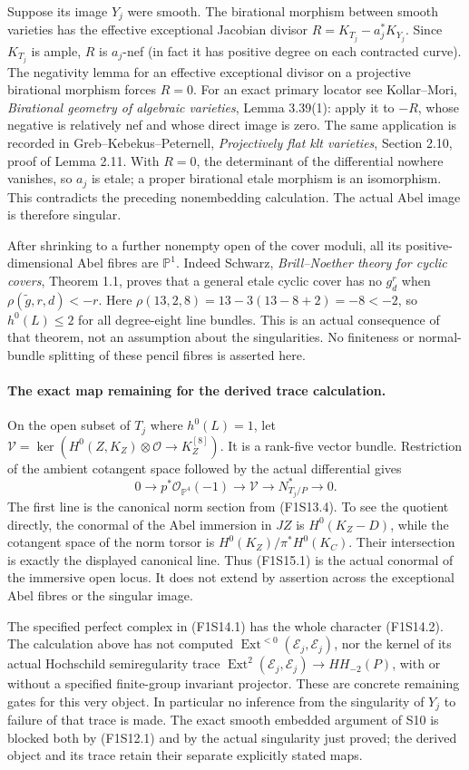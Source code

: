 Suppose its image $Y_j$ were smooth. The birational morphism between
smooth varieties has the effective exceptional Jacobian divisor
$R=K_{T_j}-a_j^*K_{Y_j}$. Since $K_{T_j}$ is ample, $R$ is $a_j$-nef
(in fact it has positive degree on each contracted curve).
The negativity lemma for an effective exceptional divisor on a
projective birational morphism forces $R=0$.
For an exact primary locator see Kollar--Mori, \emph{Birational geometry
of algebraic varieties}, Lemma 3.39(1): apply it to $-R$, whose negative
is relatively nef and whose direct image is zero. The same application
is recorded in Greb--Kebekus--Peternell, \emph{Projectively flat klt
varieties}, Section 2.10, proof of Lemma 2.11.
With $R=0$, the determinant of the differential nowhere vanishes, so
$a_j$ is etale; a proper birational etale morphism is an isomorphism.
This contradicts the preceding nonembedding calculation. The actual
Abel image is therefore singular.

After shrinking to a further nonempty open of the cover moduli, all its
positive-dimensional Abel fibres are $\mathbb P^1$. Indeed Schwarz,
\emph{Brill--Noether theory for cyclic covers}, Theorem 1.1, proves that
a general etale cyclic cover has no $g_d^r$ when
$\rho(\widetilde g,r,d)<-r$. Here
$\rho(13,2,8)=13-3(13-8+2)=-8<-2$, so $h^0(L)\leq2$ for all degree-eight
line bundles. This is an actual consequence of that theorem, not an
assumption about the singularities. No finiteness or normal-bundle
splitting of these pencil fibres is asserted here.

\paragraph{The exact map remaining for the derived trace calculation.}
On the open subset of $T_j$ where $h^0(L)=1$, let
$\mathcal V=\ker(H^0(Z,K_Z)\otimes\mathcal O\to K_Z^{[8]})$.
It is a rank-five vector bundle. Restriction of the ambient cotangent
space followed by the actual differential gives
\[
 0\longrightarrow p^*\mathcal O_{\mathbb P^4}(-1)
 \longrightarrow\mathcal V\longrightarrow N^*_{T_j/P}\longrightarrow0.
 \tag{F1S15.1}
\]
The first line is the canonical norm section from (F1S13.4).
To see the quotient directly, the conormal of the Abel immersion in
$JZ$ is $H^0(K_Z-D)$, while the cotangent space of the norm torsor is
$H^0(K_Z)/\pi^*H^0(K_C)$. Their intersection is exactly the displayed
canonical line. Thus (F1S15.1) is the actual conormal of the immersive
open locus. It does not extend by assertion across the exceptional
Abel fibres or the singular image.

The specified perfect complex in (F1S14.1) has the whole character
(F1S14.2). The calculation above has not computed
$\operatorname{Ext}^{<0}(\mathcal E_j,\mathcal E_j)$, nor the kernel of
its actual Hochschild semiregularity trace
$\operatorname{Ext}^2(\mathcal E_j,\mathcal E_j)\to HH_{-2}(P)$,
with or without a specified finite-group invariant projector.
These are concrete remaining gates for this very object. In particular
no inference from the singularity of $Y_j$ to failure of that trace is
made. The exact smooth embedded argument of S10 is blocked both by
(F1S12.1) and by the actual singularity just proved; the derived object
and its trace retain their separate explicitly stated maps.
